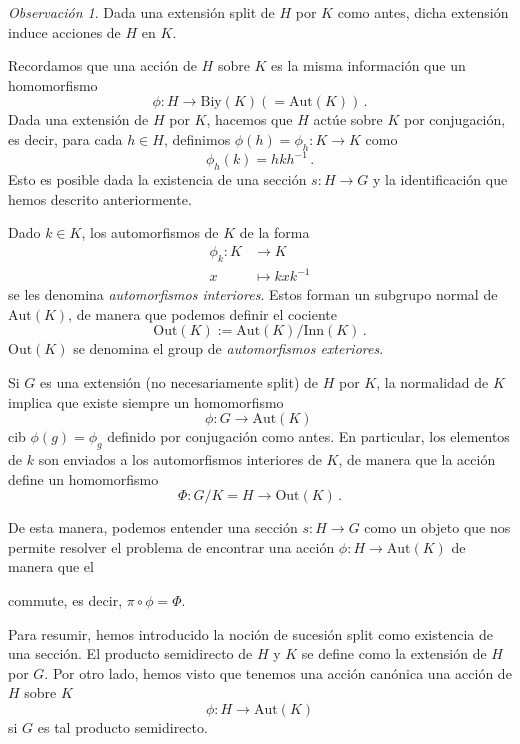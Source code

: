 \documentclass[a4paper,11pt]{amsart}
\theoremstyle{plain}
\theoremstyle{definition}
\theoremstyle{remark}
\newtheorem*{rem}{Observación}
\begin{document}
\begin{rem}
Dada una extensión split de $H$ por $K$ como antes, dicha extensión induce acciones de $H$ en $K$. 

Recordamos que una acción de $H$ sobre $K$ es la misma información que un homomorfismo 
\[ \phi \colon H \to \text{Biy}(K) (= \text{Aut}(K)) \, . \]
Dada una extensión de $H$ por $K$, hacemos que $H$ actúe sobre $K$ por conjugación, es decir, para cada $h \in H$, definimos $\phi(h) = \phi_h \colon K \to K$ como 
\[ \phi_h(k) = hkh^{-1} \, . \]
Esto es posible dada la existencia de una sección $s \colon H \to G$ y la identificación que hemos descrito anteriormente.

Dado $k \in K$, los automorfismos de $K$ de la forma 
\begin{align*}
    \phi_k \colon K &\to K \\
    x & \mapsto kxk^{-1}
\end{align*}
se les denomina \textit{automorfismos interiores}. Estos forman un subgrupo normal de $\text{Aut}(K)$, de manera que podemos definir el cociente 
\[ \text{Out}(K) := \text{Aut}(K)/\text{Inn}(K) \, . \]
$\text{Out}(K)$ se denomina el group de \textit{automorfismos exteriores}. 

Si $G$ es una extensión (no necesariamente split) de $H$ por $K$, la normalidad de $K$ implica que existe siempre un homomorfismo 
\[ \phi \colon G \to \text{Aut}(K) \,\]
cib $\phi(g) = \phi_g$ definido por conjugación como antes. En particular, los elementos de $k$ son enviados a los automorfismos interiores de $K$, de manera que la acción define un homomorfismo
\[ \Phi \colon G/K = H \to \text{Out}(K) \, . \]


De esta manera, podemos entender una sección $s \colon H \to G$ como un objeto que nos permite resolver el problema de encontrar una acción $\phi \colon H \to \text{Aut}(K)$ de manera que el 
\begin{center}
\end{center}
commute, es decir, $\pi \circ \phi = \Phi$.
\end{rem}

Para resumir, hemos introducido la noción de sucesión split como existencia de una sección. El producto semidirecto de $H$ y $K$ se define como la extensión de $H$ por $G$. Por otro lado, hemos visto que tenemos una acción canónica una acción de $H$ sobre $K$ 
\[ \phi \colon H \to \text{Aut}(K)\]
si $G$ es tal producto semidirecto. 
\end{document}
